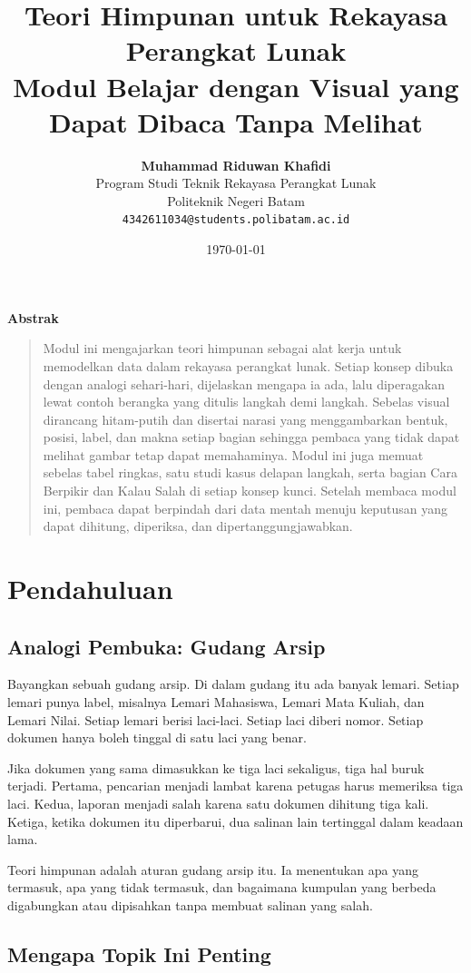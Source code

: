 \documentclass[11pt,a4paper]{article}
\title{\vspace{-1.5cm}\textbf{\sffamily\LARGE Teori Himpunan untuk Rekayasa Perangkat Lunak\\ Modul Belajar dengan Visual yang Dapat Dibaca Tanpa Melihat}}
\author{
	\textbf{Muhammad Riduwan Khafidi} \\
	\small Program Studi Teknik Rekayasa Perangkat Lunak \\
	\small Politeknik Negeri Batam \\
	\small \texttt{4342611034@students.polibatam.ac.id}
}
\date{\small\today}
\renewenvironment{abstract}
{\small
	\begin{center}\textbf{\sffamily Abstrak}\end{center}
	\begin{quote}}
	{\end{quote}}
\begin{document}
\maketitle
\thispagestyle{empty}

\begin{abstract}
	Modul ini mengajarkan teori himpunan sebagai alat kerja untuk memodelkan data dalam rekayasa perangkat lunak. Setiap konsep dibuka dengan analogi sehari-hari, dijelaskan mengapa ia ada, lalu diperagakan lewat contoh berangka yang ditulis langkah demi langkah. Sebelas visual dirancang hitam-putih dan disertai narasi yang menggambarkan bentuk, posisi, label, dan makna setiap bagian sehingga pembaca yang tidak dapat melihat gambar tetap dapat memahaminya. Modul ini juga memuat sebelas tabel ringkas, satu studi kasus delapan langkah, serta bagian Cara Berpikir dan Kalau Salah di setiap konsep kunci. Setelah membaca modul ini, pembaca dapat berpindah dari data mentah menuju keputusan yang dapat dihitung, diperiksa, dan dipertanggungjawabkan.
\end{abstract}

\section{Pendahuluan}

\subsection{Analogi Pembuka: Gudang Arsip}

Bayangkan sebuah gudang arsip. Di dalam gudang itu ada banyak lemari. Setiap lemari punya label, misalnya Lemari Mahasiswa, Lemari Mata Kuliah, dan Lemari Nilai. Setiap lemari berisi laci-laci. Setiap laci diberi nomor. Setiap dokumen hanya boleh tinggal di satu laci yang benar.

Jika dokumen yang sama dimasukkan ke tiga laci sekaligus, tiga hal buruk terjadi. Pertama, pencarian menjadi lambat karena petugas harus memeriksa tiga laci. Kedua, laporan menjadi salah karena satu dokumen dihitung tiga kali. Ketiga, ketika dokumen itu diperbarui, dua salinan lain tertinggal dalam keadaan lama.

Teori himpunan adalah aturan gudang arsip itu. Ia menentukan apa yang termasuk, apa yang tidak termasuk, dan bagaimana kumpulan yang berbeda digabungkan atau dipisahkan tanpa membuat salinan yang salah.

\subsection{Mengapa Topik Ini Penting}
\end{document}
